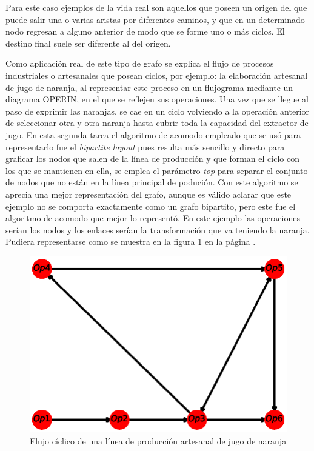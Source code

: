 \documentclass{article}
\begin{document}
Para este caso ejemplos de la vida real son aquellos que poseen un origen del que puede salir una o varias aristas por diferentes caminos, y que en un determinado nodo regresan a alguno anterior de modo que se forme uno o más ciclos. El destino final suele ser diferente al del origen. 

Como aplicación real de este tipo de grafo se explica el flujo de procesos industriales o artesanales que posean ciclos, por ejemplo: la elaboración artesanal de jugo de naranja, al representar este proceso en un flujograma mediante un diagrama OPERIN, en el que se reflejen sus operaciones. Una vez que se llegue al paso de exprimir las naranjas, se cae en un ciclo volviendo a la operación anterior de seleccionar otra y otra naranja hasta cubrir toda la capacidad del extractor de jugo. En esta segunda tarea el algoritmo de acomodo empleado que se usó para representarlo fue el \textit{bipartite layout} pues resulta más sencillo y directo para graficar los nodos que salen de la línea de producción y que forman el ciclo con los que se mantienen en ella, se emplea el parámetro \textit{top} para separar el conjunto de nodos que no están en la línea principal de podución. Con este algoritmo se aprecia una mejor representación del grafo, aunque es válido aclarar que este ejemplo no se comporta exactamente como un grafo bipartito, pero este fue el algoritmo de acomodo que mejor lo representó. En este ejemplo las operaciones serían los nodos  y los enlaces serían la transformación que va teniendo la naranja. Pudiera representarse como se muestra en la figura \ref{fig:Fig05} en la página \pageref{fig:Fig05}.

\newpage


\begin{figure}[h]
    \centering
    \includegraphics[scale=0.6]{imagenes1/Fig05.eps}
    \caption{Flujo cíclico de una línea de producción artesanal de jugo de naranja}
    \label{fig:Fig05}
\end{figure}
\end{document}
